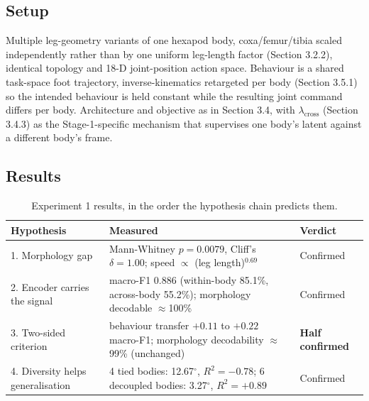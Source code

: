 \documentclass[12pt,a4paper,oneside]{report}
\begin{document}
\subsection{Setup}
Multiple leg-geometry variants of one hexapod body, coxa/femur/tibia scaled independently rather than by one
uniform leg-length factor (Section 3.2.2), identical topology and 18-D joint-position action space. Behaviour is
a shared task-space foot trajectory, inverse-kinematics retargeted per body (Section 3.5.1) so the intended
behaviour is held constant while the resulting joint command differs per body. Architecture and objective as in
Section 3.4, with $\lambda_{\text{cross}}$ (Section 3.4.3) as the Stage-1-specific mechanism that supervises one
body's latent
against a different body's frame.

\subsection{Results}
\begin{table}[H]
\centering
\footnotesize
\setlength{\tabcolsep}{4pt}
\caption{Experiment 1 results, in the order the hypothesis chain predicts them.}
\label{tab:exp1-results}
\begin{tabular}{P{3.6cm}P{7.4cm}P{2.2cm}}
\hline
\textbf{Hypothesis} & \textbf{Measured} & \textbf{Verdict}\\
. Morphology gap & Mann-Whitney $p=0.0079$, Cliff's $\delta=1.00$; speed $\propto$ (leg length)$^{0.69}$ &
  Confirmed\\
2. Encoder carries the signal & macro-F1 0.886 (within-body 85.1\%, across-body 55.2\%); morphology decodable
  $\approx$100\% & Confirmed\\
3. Two-sided criterion & behaviour transfer $+0.11$ to $+0.22$ macro-F1; morphology decodability
  $\approx$99\% (unchanged) & \textbf{Half confirmed}\\
4. Diversity helps generalisation & 4 tied bodies: 12.67$^\circ$, $R^2=-0.78$; 6 decoupled bodies: 3.27$^\circ$,
  $R^2=+0.89$ & Confirmed\\
\hline
\end{tabular}
\end{table}
\end{document}
